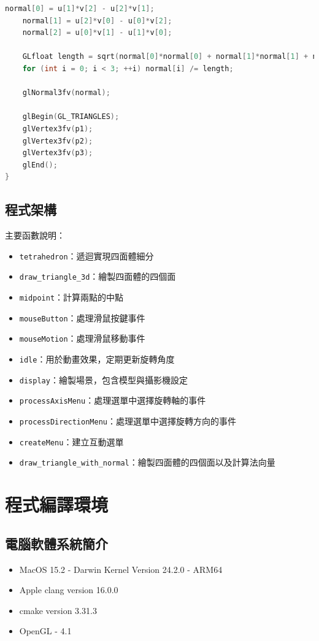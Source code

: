 \documentclass[12pt,a4paper]{article}
\begin{document}
\begin{enumerate}
\begin{lstlisting}[language=C++,breaklines=true]
    normal[0] = u[1]*v[2] - u[2]*v[1];
    normal[1] = u[2]*v[0] - u[0]*v[2];
    normal[2] = u[0]*v[1] - u[1]*v[0];

    GLfloat length = sqrt(normal[0]*normal[0] + normal[1]*normal[1] + normal[2]*normal[2]);
    for (int i = 0; i < 3; ++i) normal[i] /= length;

    glNormal3fv(normal);

    glBegin(GL_TRIANGLES);
    glVertex3fv(p1);
    glVertex3fv(p2);
    glVertex3fv(p3);
    glEnd();
}
\end{lstlisting}
  


\end{enumerate}
\newpage
\subsection*{程式架構}
\noindent 主要函數說明：
\begin{itemize}
\item \texttt{tetrahedron}：遞迴實現四面體細分
\item \texttt{draw\_triangle\_3d}：繪製四面體的四個面
\item \texttt{midpoint}：計算兩點的中點
\item \texttt{mouseButton}：處理滑鼠按鍵事件
\item \texttt{mouseMotion}：處理滑鼠移動事件
\item \texttt{idle}：用於動畫效果，定期更新旋轉角度
\item \texttt{display}：繪製場景，包含模型與攝影機設定
\item \texttt{processAxisMenu}：處理選單中選擇旋轉軸的事件
\item \texttt{processDirectionMenu}：處理選單中選擇旋轉方向的事件
\item \texttt{createMenu}：建立互動選單
\item \texttt{draw\_triangle\_with\_normal}：繪製四面體的四個面以及計算法向量
\end{itemize}

\section*{程式編譯環境}
\subsection*{電腦軟體系統簡介}
\begin{itemize}
  \item MacOS 15.2 - Darwin Kernel Version 24.2.0 - ARM64
  \item Apple clang version 16.0.0
  \item cmake version 3.31.3
  \item OpenGL - 4.1
\end{itemize}
\end{document}
